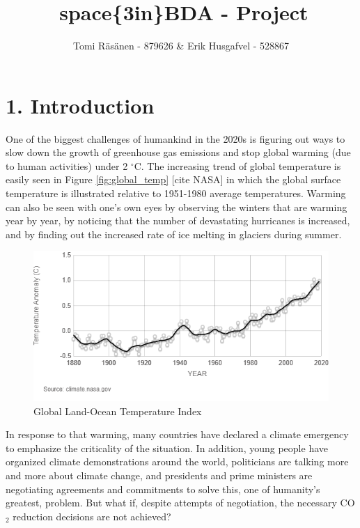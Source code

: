 \documentclass[
]{article}
\title{space\{3in\}BDA - Project}
\author{Tomi Räsänen - 879626 \& Erik Husgafvel - 528867}
\date{}
\begin{document}
\maketitle

\newpage

{
\setcounter{tocdepth}{2}
\tableofcontents
}
\newpage

\hypertarget{introduction}{%
\section{1. Introduction}\label{introduction}}

One of the biggest challenges of humankind in the 2020s is figuring out
ways to slow down the growth of greenhouse gas emissions and stop global
warming (due to human activities) under 2 \(^{\circ}\)C. The increasing
trend of global temperature is easily seen in Figure
\ref{fig:global_temp} {[}cite NASA{]} in which the global surface
temperature is illustrated relative to 1951-1980 average temperatures.
Warming can also be seen with one's own eyes by observing the winters
that are warming year by year, by noticing that the number of
devastating hurricanes is increased, and by finding out the increased
rate of ice melting in glaciers during summer.

\begin{figure}
\includegraphics[width=1\linewidth]{GlobalTemp} \caption{\label{fig:global_temp}Global Land-Ocean Temperature Index}\label{fig:globaltemp}
\end{figure}

In response to that warming, many countries have declared a climate
emergency to emphasize the criticality of the situation. In addition,
young people have organized climate demonstrations around the world,
politicians are talking more and more about climate change, and
presidents and prime ministers are negotiating agreements and
commitments to solve this, one of humanity's greatest, problem. But what
if, despite attempts of negotiation, the necessary CO\(_2\) reduction
decisions are not achieved?
\end{document}
